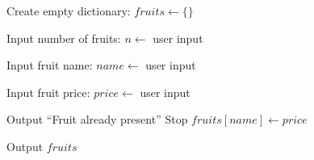 \begin{algorithm}
\caption{Add Fruits and Prices to a Dictionary}
\begin{algorithmic}[1]

\STATE Create empty dictionary:
\STATE $fruits \gets \{\}$

\STATE Input number of fruits:
\STATE $n \gets$ user input


    \STATE Input fruit name:
    \STATE $name \gets$ user input

    \STATE Input fruit price:
    \STATE $price \gets$ user input

        \STATE Output ``Fruit already present''
        \STATE Stop
    \ELSE
        \STATE $fruits[name] \gets price$
    \ENDIF

    \STATE Output $fruits$

\ENDFOR

\end{algorithmic}
\end{algorithm}